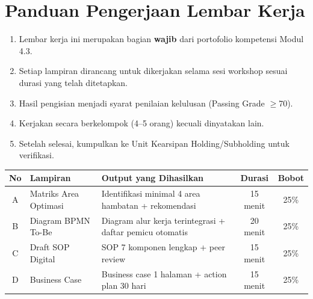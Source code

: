 \documentclass[12pt,a4paper]{report}
\begin{document}
\newpage
\thispagestyle{fancy}

\section*{\color{plnblue}Panduan Pengerjaan Lembar Kerja}

\begin{infobox}
\begin{enumerate}
    \item Lembar kerja ini merupakan bagian \textbf{wajib} dari portofolio kompetensi Modul 4.3.
    \item Setiap lampiran dirancang untuk dikerjakan selama sesi workshop sesuai durasi yang telah ditetapkan.
    \item Hasil pengisian menjadi syarat penilaian kelulusan (Passing Grade $\geq$70).
    \item Kerjakan secara berkelompok (4--5 orang) kecuali dinyatakan lain.
    \item Setelah selesai, kumpulkan ke Unit Kearsipan Holding/Subholding untuk verifikasi.
\end{enumerate}
\end{infobox}

\vspace{0.4cm}


\vspace{0.2cm}

{\small
\renewcommand{\arraystretch}{1.6}
\begin{tabularx}{\textwidth}{@{} c p{4.2cm} X c c @{}}
\toprule
\textbf{No} & \textbf{Lampiran} & \textbf{Output yang Dihasilkan} & \textbf{Durasi} & \textbf{Bobot} \\
\midrule
A & Matriks Area Optimasi & Identifikasi minimal 4 area hambatan + rekomendasi & 15 menit & 25\% \\
B & Diagram BPMN To-Be & Diagram alur kerja terintegrasi + daftar pemicu otomatis & 20 menit & 25\% \\
C & Draft SOP Digital & SOP 7 komponen lengkap + peer review & 15 menit & 25\% \\
D & Business Case & Business case 1 halaman + action plan 30 hari & 15 menit & 25\% \\
\bottomrule
\end{tabularx}
\renewcommand{\arraystretch}{1.0}
}
\end{document}
